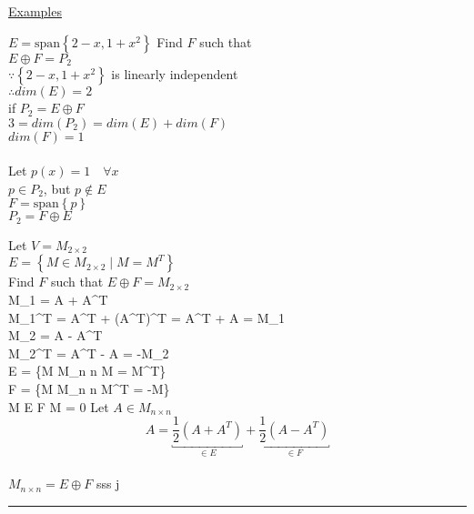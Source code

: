 \documentclass[12pt]{article}
\newcommand{\uu}[1]{\underbracket{#1}}
\newenvironment{examples}{\shownto{-,compact}\underline{Examples}\enumerate}{\endenumerate\divider\endshownto}
\newcommand{\bb}[1]{\left\{#1\right\}}
\newcommand{\pp}[1]{\left(#1\right)}
\newcommand{\divider}[0]{\textcolor{lightgray}{\rule{\textwidth}{0.1pt}}}
\newcommand{\sspan}[1]{\text{span}\bb{#1}}
\newenvironment{eqn}{\equation\alignedat{3}}{\endalignedat\endequation}
\begin{document}
\begin{examples}
	\item $E = \sspan{2 - x, 1 + x^2}$ \qquad Find $F$ such that \\
	$E \oplus F = P_2$ \\
	$\because \bb{2 - x, 1 + x^2}$ is linearly independent \\
	$\therefore dim(E) = 2$ \\
	if $P_2 = E \oplus F$ \\ 
	$3 = dim(P_2) = dim(E) + dim(F)$ \\
	$dim(F) = 1$ \\\\
	Let $p(x) = 1 \quad \forall x$ \\
	$p \in P_2$, but $p \notin E$ \\
	$F = \sspan{p}$ \\
	$P_2 = F \oplus E$
	
	\item Let $V = M_{2 \times 2}$ \\
	$E = \bb{M \in M_{2 \times 2} \mid M = M^T}$ \\
	Find $F$ such that $E \oplus F = M_{2 \times 2}$ \\
	
	\begin{eqn}
		M_1 = A + A^T \\
		M_1^T = A^T + \pp{A^T}^T = A^T + A = M_1 \\
		M_2 = A - A^T \\
		M_2^T = A^T - A = -M_2 \\
		E = \bb{M \in M_{n \times n} \mid M = M^T} \\
		F = \bb{M \in M_{n \times n} \mid M^T = -M} \\
		M \in E \cap F \Rightarrow M = 0 
	\end{eqn}
	Let $A \in M_{n \times n}$ \\
	$$A = \uu{\frac{1}{2} (A + A^T)}_{\in E} + \uu{\frac{1}{2} (A - A^T)}_{\in F}$$ \\
	$M_{n \times n} = E \oplus F$
sss	j
\end{examples}
\end{document}
